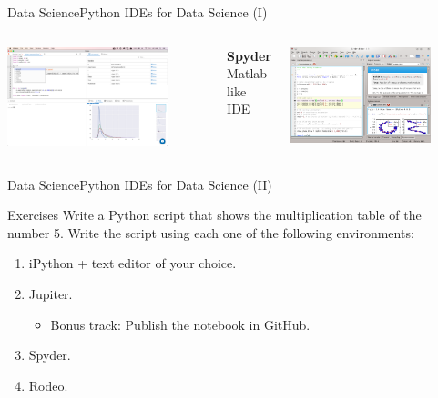 \documentclass[10pt,compress]{beamer} %
\begin{document}
\begin{frame}{Data Science}{Python IDEs for Data Science (I)}
\begin{columns}[t]
        \bigskip

		\includegraphics[width=0.8\textwidth]{figs/rodeo.png}	

	   \centering \textbf{Spyder}\\
		Matlab-like IDE

        \bigskip

		\includegraphics[width=0.8\textwidth]{figs/spyder-ide.png}	

	\end{columns}
\end{frame}

\begin{frame}{Data Science}{Python IDEs for Data Science (II)}
    \begin{block}{Exercises}
		Write a Python script that shows the multiplication table of the number 5. Write the script using each one of the following environments:
   		\begin{enumerate}
   		\item iPython + text editor of your choice.
		\item Jupiter. 
            \begin{itemize}
                \item Bonus track: Publish the notebook in GitHub.
            \end{itemize}
		\item Spyder.
		\item Rodeo.
		\end{enumerate}
	\end{block}
\end{frame}
\end{document}
